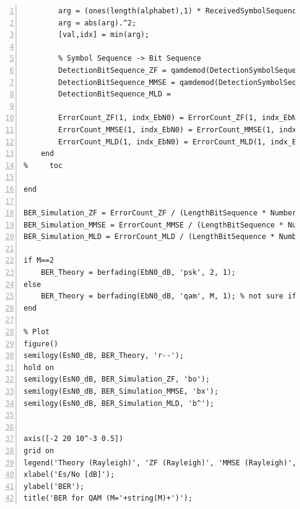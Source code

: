 \documentclass{article}
\begin{document}
\begin{lstlisting}[style=Matlab-editor, frame=single, numbers=left,]
        % MLD Receiver;
        arg = (ones(length(alphabet),1) * ReceivedSymbolSequence) - (alphabet.' * H);
        arg = abs(arg).^2;
        [val,idx] = min(arg);

        % Symbol Sequence -> Bit Sequence
        DetectionBitSequence_ZF = qamdemod(DetectionSymbolSequence_ZF.', M, 'OutputType', 'bit', 'UnitAveragePower', 1)'; % Detection
        DetectionBitSequence_MMSE = qamdemod(DetectionSymbolSequence_MMSE.', M, 'OutputType', 'bit', 'UnitAveragePower', 1)'; % tmp value;
        DetectionBitSequence_MLD = 

        ErrorCount_ZF(1, indx_EbN0) = ErrorCount_ZF(1, indx_EbN0) + sum(DetectionBitSequence_ZF~=BitSequence);
        ErrorCount_MMSE(1, indx_EbN0) = ErrorCount_MMSE(1, indx_EbN0) + sum(DetectionBitSequence_MMSE~=BitSequence);
        ErrorCount_MLD(1, indx_EbN0) = ErrorCount_MLD(1, indx_EbN0) + sum(DetectionBitSequence_MLD~=BitSequence);
    end
%     toc
    
end

BER_Simulation_ZF = ErrorCount_ZF / (LengthBitSequence * NumberIteration);
BER_Simulation_MMSE = ErrorCount_MMSE / (LengthBitSequence * NumberIteration);
BER_Simulation_MLD = ErrorCount_MLD / (LengthBitSequence * NumberIteration);

if M==2
    BER_Theory = berfading(EbN0_dB, 'psk', 2, 1);
else
    BER_Theory = berfading(EbN0_dB, 'qam', M, 1); % not sure if 'dataenc' needs to be specified; I don't even know what it does
end

% Plot
figure()
semilogy(EsN0_dB, BER_Theory, 'r--');
hold on
semilogy(EsN0_dB, BER_Simulation_ZF, 'bo');
semilogy(EsN0_dB, BER_Simulation_MMSE, 'bx');
semilogy(EsN0_dB, BER_Simulation_MLD, 'b^');


axis([-2 20 10^-3 0.5])
grid on
legend('Theory (Rayleigh)', 'ZF (Rayleigh)', 'MMSE (Rayleigh)', 'MLD (Rayleigh)');
xlabel('Es/No [dB]');
ylabel('BER');
title('BER for QAM (M='+string(M)+')');
\end{lstlisting}
\end{document}
